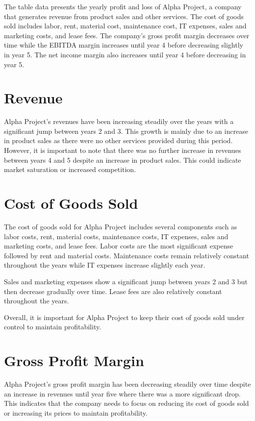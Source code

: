 
The table data presents the yearly profit and loss of Alpha Project, a company that generates revenue from product sales and other services. The cost of goods sold includes labor, rent, material cost, maintenance cost, IT expenses, sales and marketing costs, and lease fees. The company's gross profit margin decreases over time while the EBITDA margin increases until year 4 before decreasing slightly in year 5. The net income margin also increases until year 4 before decreasing in year 5.

\section{Revenue}

Alpha Project's revenues have been increasing steadily over the years with a significant jump between years 2 and 3. This growth is mainly due to an increase in product sales as there were no other services provided during this period. However, it is important to note that there was no further increase in revenues between years 4 and 5 despite an increase in product sales. This could indicate market saturation or increased competition.

\section{Cost of Goods Sold}

The cost of goods sold for Alpha Project includes several components such as labor costs, rent, material costs, maintenance costs, IT expenses, sales and marketing costs, and lease fees. Labor costs are the most significant expense followed by rent and material costs. Maintenance costs remain relatively constant throughout the years while IT expenses increase slightly each year.

Sales and marketing expenses show a significant jump between years 2 and 3 but then decrease gradually over time. Lease fees are also relatively constant throughout the years.

Overall, it is important for Alpha Project to keep their cost of goods sold under control to maintain profitability.

\section{Gross Profit Margin}

Alpha Project's gross profit margin has been decreasing steadily over time despite an increase in revenues until year five where there was a more significant drop. This indicates that the company needs to focus on reducing its cost of goods sold or increasing its prices to maintain profitability.

